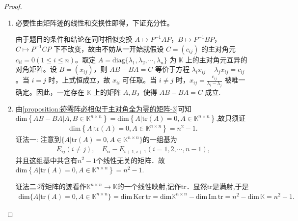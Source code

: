 \documentclass[../../main.tex]{subfiles}%
\begin{document}
\begin{proof}
\begin{enumerate}[(1)]
\item 必要性由矩阵迹的线性和交换性即得，下证充分性。

由于题目的条件和结论在同时相似变换 $A\mapsto P^{-1}AP$，$B\mapsto P^{-1}BP$，$C\mapsto P^{-1}CP$ 下不改变，故由不妨从一开始就假设 $C=(c_{ij})$ 的主对角元 $c_{ii}=0 (1\leqslant  i\leqslant  n)$。取定 $A = \mathrm{diag}\{\lambda_1,\lambda_2,\cdots,\lambda_n\}$ 为 $\mathbb{K}$ 上的主对角元互异的对角矩阵。设 $B=(x_{ij})$，则 $AB - BA = C$ 等价于方程 $\lambda_ix_{ij}-\lambda_jx_{ij}=c_{ij}$。当 $i = j$ 时，上式恒成立，故 $x_{ii}$ 可任取。当 $i\neq j$ 时，$x_{ij}=\frac{c_{ij}}{\lambda_i - \lambda_j}$ 被唯一确定。因此，一定存在 $\mathbb{K}$ 上的矩阵 $A,B$，使得 $AB - BA = C$ 成立.

\item 由\ref{proposition:迹零阵必相似于主对角全为零的矩阵-3}可知$\mathrm{dim}\left\{ AB-BA|A,B\in \mathbb{K} ^{n\times n} \right\} =\mathrm{dim}\left\{ A|\mathrm{tr}\left( A \right) =0,A\in \mathbb{K}^{n\times n} \right\} $,故只须证
\begin{align*}
\mathrm{dim}\left\{ A|\mathrm{tr}\left( A \right) =0,A\in \mathbb{K}^{n\times n} \right\} =n^2-1.
\end{align*}
{\color{blue} 证法一:}
注意到$\{ A|\mathrm{tr}(A) =0,A\in \mathbb{K}^{n\times n} \}$的一组基为  
\begin{align*}
E_{ij}(i\ne j),\quad E_{ii}-E_{i+1,i+1}(i=1,2,\cdots,n-1),
\end{align*}
并且这组基中共含有$n^2-1$个线性无关的矩阵．故$\mathrm{dim}\left\{ A|\mathrm{tr}\left( A \right) =0,A\in \mathbb{K}^{n\times n} \right\} =n^2-1.$  

{\color{blue} 证法二:}将矩阵的迹看作$\mathbb{K} ^{n\times n}\rightarrow \mathbb{K}$的一个线性映射,记作$\mathrm{tr}$．显然$\mathrm{tr}$是满射,于是  
\begin{align*}
\mathrm{dim}\{ A|\mathrm{tr}(A) =0,A\in \mathbb{K}^{n\times n} \} = \mathrm{dim}\,\mathrm{Ker}\,\mathrm{tr} = \mathrm{dim}\mathbb{K} ^{n\times n} - \mathrm{dim}\,\mathrm{Im}\,\mathrm{tr} = n^2 - \mathrm{dim}\,\mathbb{K} = n^2-1.
\end{align*}
\end{enumerate}
\end{proof}
\end{document}
